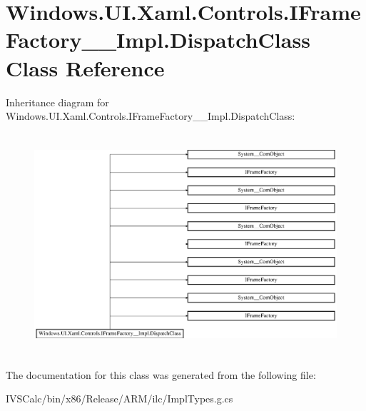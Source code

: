 \hypertarget{class_windows_1_1_u_i_1_1_xaml_1_1_controls_1_1_i_frame_factory_____impl_1_1_dispatch_class}{}\section{Windows.\+U\+I.\+Xaml.\+Controls.\+I\+Frame\+Factory\+\_\+\+\_\+\+Impl.\+Dispatch\+Class Class Reference}
\label{class_windows_1_1_u_i_1_1_xaml_1_1_controls_1_1_i_frame_factory_____impl_1_1_dispatch_class}
Inheritance diagram for Windows.\+U\+I.\+Xaml.\+Controls.\+I\+Frame\+Factory\+\_\+\+\_\+\+Impl.\+Dispatch\+Class\+:\begin{figure}[H]
\begin{center}
\leavevmode
\includegraphics[height=8.213333cm]{class_windows_1_1_u_i_1_1_xaml_1_1_controls_1_1_i_frame_factory_____impl_1_1_dispatch_class}
\end{center}
\end{figure}


The documentation for this class was generated from the following file\+:\begin{DoxyCompactItemize}
\item 
I\+V\+S\+Calc/bin/x86/\+Release/\+A\+R\+M/ilc/Impl\+Types.\+g.\+cs\end{DoxyCompactItemize}
